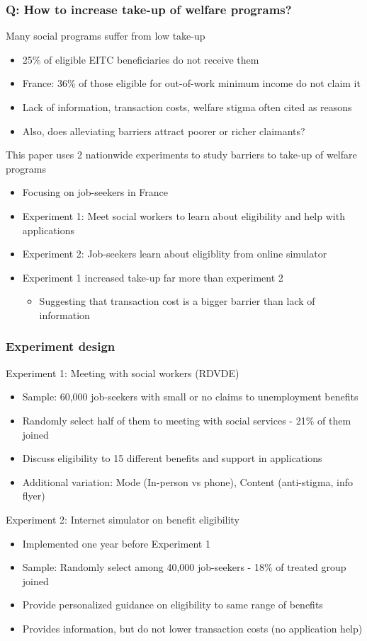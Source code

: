\documentclass[aspectratio=169]{beamer}
\begin{document}
\begin{frame}
\frametitle{Q: How to increase take-up of welfare programs?}
Many social programs suffer from low take-up
\begin{itemize}\setlength\itemsep{3pt}
\item 25\% of eligible EITC beneficiaries do not receive them
\item France: 36\% of those eligible for out-of-work minimum income do not claim it
\item Lack of information, transaction costs, welfare stigma often cited as reasons
\item Also, does alleviating barriers attract poorer or richer claimants?
\end{itemize}\medskip
This paper uses 2 nationwide experiments to study barriers to take-up of welfare programs
\begin{itemize}\setlength\itemsep{3pt}
\item Focusing on job-seekers in France
\item Experiment 1: Meet social workers to learn about eligibility and help with applications
\item Experiment 2: Job-seekers learn about eligiblity from online simulator
\item Experiment 1 increased take-up far more than experiment 2
\begin{itemize}
  \item Suggesting that transaction cost is a bigger barrier than lack of information
\end{itemize}
\end{itemize}
\end{frame}


\begin{frame}
\frametitle{Experiment design}
Experiment 1: Meeting with social workers (RDVDE)
\begin{itemize}\setlength\itemsep{3pt}
\item Sample: 60,000 job-seekers with small or no claims to unemployment benefits
\item Randomly select half of them to meeting with social services - 21\% of them joined
\item Discuss eligibility to 15 different benefits and support in applications
\item Additional variation: Mode (In-person vs phone), Content (anti-stigma, info flyer)
\end{itemize}\medskip
Experiment 2: Internet simulator on benefit eligibility
\begin{itemize}\setlength\itemsep{3pt}
\item Implemented one year before Experiment 1
\item Sample: Randomly select among 40,000 job-seekers - 18\% of treated group joined
\item Provide personalized guidance on eligibility to same range of benefits
\item Provides information, but do not lower transaction costs (no application help)
\end{itemize}
\end{frame}
\end{document}
